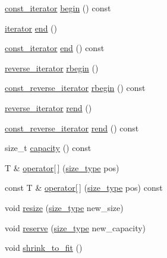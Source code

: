 \begin{DoxyCompactItemize}
\item 
\mbox{\hyperlink{classprevector_1_1const__iterator}{const\+\_\+iterator}} \mbox{\hyperlink{classprevector_af446957224d60c10d7a5c9fd226cb003}{begin}} () const
\item 
\mbox{\hyperlink{classprevector_1_1iterator}{iterator}} \mbox{\hyperlink{classprevector_aab7f6e13a3cac85cc340fc6b90c5365c}{end}} ()
\item 
\mbox{\hyperlink{classprevector_1_1const__iterator}{const\+\_\+iterator}} \mbox{\hyperlink{classprevector_a84648e4cb6298fafb70ff9bdd438fcf5}{end}} () const
\item 
\mbox{\hyperlink{classprevector_1_1reverse__iterator}{reverse\+\_\+iterator}} \mbox{\hyperlink{classprevector_ada5a19cb7dfa0271119cfd17e2bf51e1}{rbegin}} ()
\item 
\mbox{\hyperlink{classprevector_1_1const__reverse__iterator}{const\+\_\+reverse\+\_\+iterator}} \mbox{\hyperlink{classprevector_ac4c23aba698c67457c435b16ce63033d}{rbegin}} () const
\item 
\mbox{\hyperlink{classprevector_1_1reverse__iterator}{reverse\+\_\+iterator}} \mbox{\hyperlink{classprevector_a6653d7df565bf668685a418714e3d712}{rend}} ()
\item 
\mbox{\hyperlink{classprevector_1_1const__reverse__iterator}{const\+\_\+reverse\+\_\+iterator}} \mbox{\hyperlink{classprevector_add100a152fc099570286a8ba856ad5f2}{rend}} () const
\item 
size\+\_\+t \mbox{\hyperlink{classprevector_a833f4c9e5c4804fb8ac57b708657af24}{capacity}} () const
\item 
T \& \mbox{\hyperlink{classprevector_a06c929a30caa5842da7828e113030791}{operator\mbox{[}$\,$\mbox{]}}} (\mbox{\hyperlink{classprevector_a7e0da95e6d1c878f6eeb572f4fc12524}{size\+\_\+type}} pos)
\item 
const T \& \mbox{\hyperlink{classprevector_a2aa1d5299104878a9e5441459927df72}{operator\mbox{[}$\,$\mbox{]}}} (\mbox{\hyperlink{classprevector_a7e0da95e6d1c878f6eeb572f4fc12524}{size\+\_\+type}} pos) const
\item 
void \mbox{\hyperlink{classprevector_ad2d97a45e0d2872260e868a540d31860}{resize}} (\mbox{\hyperlink{classprevector_a7e0da95e6d1c878f6eeb572f4fc12524}{size\+\_\+type}} new\+\_\+size)
\item 
void \mbox{\hyperlink{classprevector_ab9a34e0210debc65efda453dbd0cbd27}{reserve}} (\mbox{\hyperlink{classprevector_a7e0da95e6d1c878f6eeb572f4fc12524}{size\+\_\+type}} new\+\_\+capacity)
\item 
void \mbox{\hyperlink{classprevector_a3b82afa760e2aabd8373994a1316523e}{shrink\+\_\+to\+\_\+fit}} ()

\end{DoxyCompactItemize}
